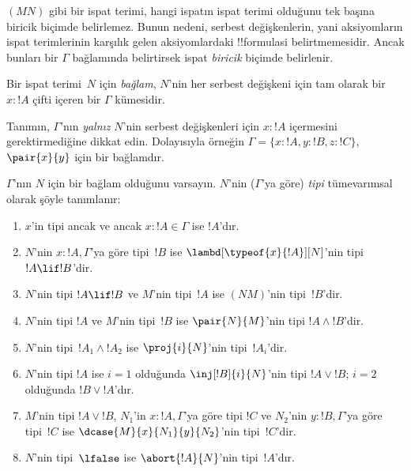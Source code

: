 



$(MN)$ gibi bir ispat terimi, hangi ispatın ispat terimi olduğunu tek
başına biricik biçimde belirlemez. Bunun nedeni, serbest değişkenlerin, yani
aksiyomların ispat terimlerinin karşılık gelen aksiyomlardaki !!{formula}s{}i
belirtmemesidir. Ancak bunları bir $\Gamma$ bağlamında belirtirsek ispat
\emph{biricik} biçimde belirlenir.

\begin{defn}
Bir ispat terimi~$N$ için \emph{bağlam}, $N$'nin her serbest değişkeni için
tam olarak bir $x : !A$ çifti içeren bir $\Gamma$ kümesidir.
\end{defn}

Tanımın, $\Gamma$'nın \emph{yalnız} $N$'nin serbest değişkenleri için
$x:!A$ içermesini gerektirmediğine dikkat edin. Dolayısıyla örneğin
$\Gamma = \{x:!A, y:!B, z:!C\}$, $\pair{x}{y}$ için bir bağlamdır.

\begin{defn}
  $\Gamma$'nın $N$ için bir bağlam olduğunu varsayın. $N$'nin
  ($\Gamma$'ya göre) \emph{tipi} tümevarımsal olarak şöyle tanımlanır:
  \begin{enumerate}
  \item $x$'in tipi ancak ve ancak $x:!A \in \Gamma$ ise $!A$'dır.
  \item $N$'nin $x:!A, \Gamma$'ya göre tipi~$!B$ ise
  $\lambd[\typeof{x}{!A}][N]$'nin tipi $!A \lif !B$'dir.
  \item $N$'nin tipi $!A \lif !B$ ve $M$'nin tipi~$!A$ ise $(NM)$'nin
  tipi~$!B$'dir.
  \item $N$'nin tipi $!A$ ve $M$'nin tipi~$!B$ ise $\pair{N}{M}$'nin
  tipi $!A \land !B$'dir.
  \item $N$'nin tipi~$!A_1 \land !A_2$ ise $\proj{i}{N}$'nin tipi~$!A_i$'dir.
  \item $N$'nin tipi $!A$ ise $i=1$ olduğunda $\inj[!B]{i}{N}$'nin tipi
  $!A \lor !B$; $i=2$ olduğunda $!B \lor !A$'dır.
  \item $M$'nin tipi $!A \lor !B$, $N_1$'in $x:!A, \Gamma$'ya göre tipi
  $!C$ ve $N_2$'nin $y:!B, \Gamma$'ya göre tipi~$!C$ ise
  $\dcase{M}{x}{N_1}{y}{N_2}$'nin tipi~$!C$'dir.
  \item $N$'nin tipi~$\lfalse$ ise $\abort{!A}{N}$'nin tipi~$!A$'dır.
  \end{enumerate}
\end{defn}

